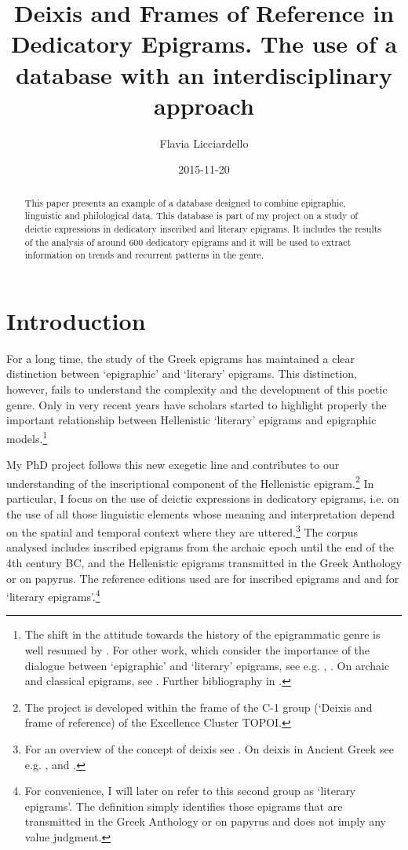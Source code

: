 \documentclass[amsthm,ebook]{saparticle}
\title{Deixis and Frames of Reference in Dedicatory Epigrams. 
The use of a database with an interdisciplinary approach}
\author[topoi]{Flavia Licciardello\corref{first}}
\date{2015-11-20}
\begin{document}
\maketitle
\begin{abstract}
This paper presents an example of a database designed to combine epigraphic, linguistic and philological data. This database is part of my project on a study of deictic expressions in dedicatory inscribed and
literary epigrams. It includes the results of the analysis of around 600 dedicatory epigrams and it will be used to
extract information on trends and recurrent patterns in the genre.
\end{abstract}

\section{Introduction}


\noindent For a long time, the study of the Greek epigrams has maintained a clear distinction between `epigraphic' and `literary'
epigrams. This distinction, however, fails to understand the complexity and the development of this poetic genre. Only
in very recent years have scholars started to highlight properly the important relationship between Hellenistic
`literary' epigrams and epigraphic models.\footnote{ The shift in the attitude towards the history of the epigrammatic
genre is well resumed by \citep[5-34]{garulli_byblos_2012}. For other work, which consider the importance of the dialogue between
`epigraphic' and `literary' epigrams, see e.g. \citep{meyer_inszeniertes_2005}, \citep{tueller_look_2008}. On archaic and classical epigrams, see
\citep{baumbach_archaic_2010}. Further bibliography in \citep[2]{baumbach_archaic_2010}.} 

My PhD project follows this new exegetic line and contributes to our understanding of the inscriptional component of the
Hellenistic epigram.\footnote{ The project is developed within the frame of the C-1 group (`Deixis and frame of
reference) of the Excellence Cluster TOPOI.} In particular, I focus on the use of deictic expressions in dedicatory
epigrams, i.e. on the use of all those linguistic elements whose meaning and interpretation depend on the spatial and
temporal context where they are uttered.\footnote{ For an overview of the concept of deixis see \citet[with further bibliography)]{diessel_deixis_2012}. On deixis in Ancient Greek see e.g. \citet{felson_poetics_2004}, \citet{edmunds_deixis_2008} and \citep{bonifazi_deixis_2014}.} The
corpus analysed includes inscribed epigrams from the archaic epoch until the end of the 4th century BC, and the
Hellenistic epigrams transmitted in the Greek Anthology or on papyrus. The reference editions used are \citep[1-2]{hansen_carmina_1983}
for inscribed epigrams and \citep{gow_greek_1965} and \citep{austin_posidippi_2002} for `literary epigrams'.\footnote{ For
convenience, I will later on refer to this second group as `literary epigrams'. The definition simply identifies those
epigrams that are transmitted in the Greek Anthology or on papyrus and does not imply any value judgment.} 
\end{document}
